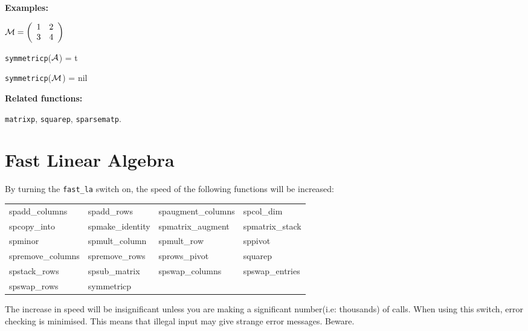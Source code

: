 {\bf Examples:}

\begin{flushleft}
\hspace*{0.175in}
\begin{math}  
{\cal M} = \left( \begin{array}{cc} 1 & 2 \\ 3 & 4 
\end{array} \right)
\end{math}  
\end{flushleft}

\vspace*{0.1in}

\hspace*{0.175in} {\tt symmetricp}(${\cal A}$) = t 

\hspace*{0.175in} {\tt symmetricp}(${\cal M}$) = nil

{\bf Related functions:}

\hspace*{0.175in} {\tt matrixp}, {\tt squarep}, {\tt sparsematp}.

\section{Fast Linear Algebra}

By turning the {\tt fast\_la} switch on, the speed of the following 
functions will be increased:

\begin{tabular}{l l l l}
spadd\_columns    & spadd\_rows      & spaugment\_columns & spcol\_dim  \\
spcopy\_into      & spmake\_identity & spmatrix\_augment  & spmatrix\_stack\\
spminor           & spmult\_column   &  spmult\_row       & sppivot        \\
spremove\_columns & spremove\_rows   & sprows\_pivot      & squarep      \\
spstack\_rows     & spsub\_matrix    & spswap\_columns    & spswap\_entries\\
spswap\_rows      & symmetricp                                     
\end{tabular}

The increase in speed will be insignificant unless you are making a 
significant number(i.e: thousands) of calls. When using this switch, 
error checking is minimised. This means that illegal input may give
strange error messages. Beware.

